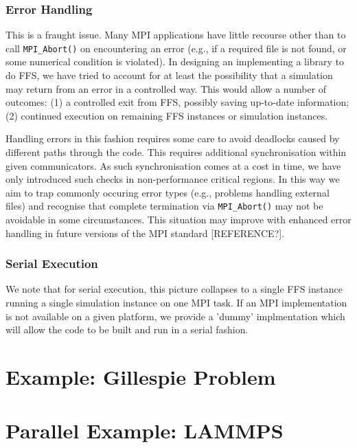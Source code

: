 \documentclass[11pt]{article}
\begin{document}
\subsubsection{Error Handling}

This is a fraught issue. Many MPI applications have little recourse
other than to call \texttt{MPI\_Abort()} on encountering an error
(e.g., if a required file is not found, or some numerical condition
is violated). In designing an implementing a library to do FFS, we
have tried to account for at least the possibility that a simulation
may return from an error in a controlled way. This would allow a number
of outcomes: (1) a controlled exit from FFS, possibly saving up-to-date
information; (2) continued execution on remaining FFS instances or
simulation instances.

Handling errors in this fashion requires some care to avoid deadlocks
caused by different paths through the code. This requires additional
synchronisation within given communicators. As such synchronisation
comes at a cost in time, we have only introduced such checks in
non-performance critical regions. In this way we aim to trap commonly
occuring error types (e.g., problems handling external files) and
recognise that complete termination via \texttt{MPI\_Abort()} may
not be avoidable in some circumstances. This
situation may improve with enhanced error handling in future versions
of the MPI standard [REFERENCE?].


\subsubsection{Serial Execution}

We note that for serial execution, this picture collapses to a single
FFS instance running a single simulation instance on one MPI task. If
an MPI implementation is not available on a given platform, we provide
a 'dummy' implmentation which will allow the code to be built and run
in a serial fashion.

\section{Example: Gillespie Problem}


\section{Parallel Example: LAMMPS}
\end{document}
